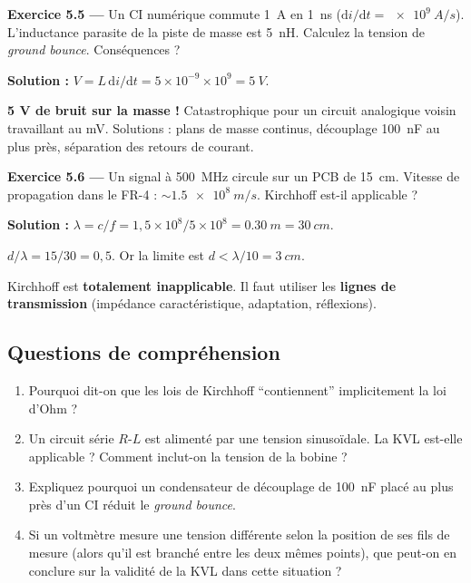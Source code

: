 \documentclass[12pt,a4paper,twoside]{book}
\begin{document}
\textbf{Exercice 5.5 ---} Un CI numérique commute \SI{1}{A} en \SI{1}{ns} ($\mathrm{d}i/\mathrm{d}t = \SI{e9}{A/s}$). L'inductance parasite de la piste de masse est \SI{5}{nH}. Calculez la tension de \textit{ground bounce}. Conséquences ?

\begin{pratique}
\textbf{Solution :} $V = L\,\mathrm{d}i/\mathrm{d}t = 5\times10^{-9} \times 10^{9} = \SI{5}{V}$.

\textbf{5 V de bruit sur la masse !} Catastrophique pour un circuit analogique voisin travaillant au mV. Solutions : plans de masse continus, découplage \SI{100}{nF} au plus près, séparation des retours de courant.
\end{pratique}

\textbf{Exercice 5.6 ---} Un signal à \SI{500}{MHz} circule sur un PCB de \SI{15}{cm}. Vitesse de propagation dans le FR-4 : $\sim\SI{1.5e8}{m/s}$. Kirchhoff est-il applicable ?

\begin{pratique}
\textbf{Solution :} $\lambda = c/f = 1{,}5\times10^8 / 5\times10^8 = \SI{0.30}{m} = \SI{30}{cm}$.

$d/\lambda = 15/30 = 0{,}5$. Or la limite est $d < \lambda/10 = \SI{3}{cm}$.

Kirchhoff est \textbf{totalement inapplicable}. Il faut utiliser les \textbf{lignes de transmission} (impédance caractéristique, adaptation, réflexions).
\end{pratique}

\subsection*{Questions de compréhension}

\begin{enumerate}[nosep]
\item Pourquoi dit-on que les lois de Kirchhoff ``contiennent'' implicitement la loi d'Ohm ?
\item Un circuit série $R$-$L$ est alimenté par une tension sinusoïdale. La KVL est-elle applicable ? Comment inclut-on la tension de la bobine ?
\item Expliquez pourquoi un condensateur de découplage de \SI{100}{nF} placé au plus près d'un CI réduit le \textit{ground bounce}.
\item Si un voltmètre mesure une tension différente selon la position de ses fils de mesure (alors qu'il est branché entre les deux mêmes points), que peut-on en conclure sur la validité de la KVL dans cette situation ?
\end{enumerate}
\end{document}
